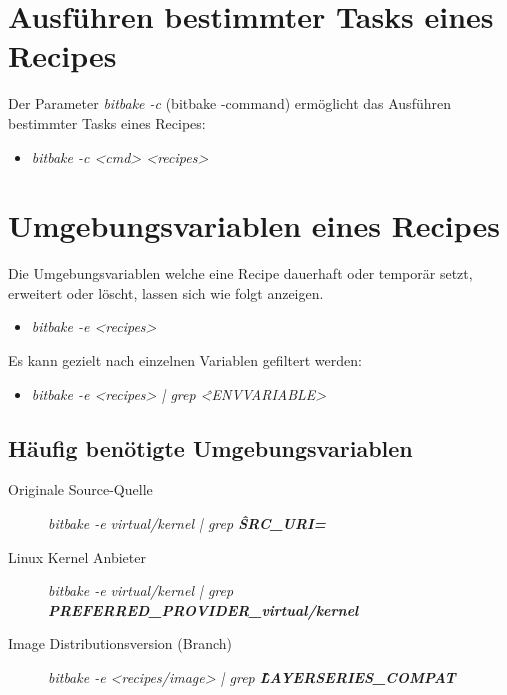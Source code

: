 \section{Ausführen bestimmter Tasks eines Recipes}%
\label{sec:ausfuhren_bestimmter_tasks_eines_recipies}

Der Parameter \textit{bitbake -c} (bitbake -command) ermöglicht das Ausführen
bestimmter Tasks eines Recipes:

\begin{itemize}
    \item \textit{bitbake -c <cmd> <recipes>}
\end{itemize}


\section{Umgebungsvariablen eines Recipes}%
\label{sec:umgebungsvariablen_eines_recipes}
Die Umgebungsvariablen welche eine Recipe dauerhaft oder temporär setzt,
erweitert oder löscht, lassen sich wie folgt anzeigen.
\begin{itemize}
    \item \textit{bitbake -e <recipes>}
\end{itemize}

Es kann gezielt nach einzelnen Variablen gefiltert werden:

\begin{itemize}
    \item \textit{bitbake -e <recipes> | grep \^<ENVVARIABLE>}
\end{itemize}

\subsection{Häufig benötigte Umgebungsvariablen}%
\label{sub:haufig_gesucht_umgebungsvariablen}

\begin{description}
   \item[Originale Source-Quelle] \textit{bitbake -e virtual/kernel | grep
       \textbf{\^SRC\_URI=}}
    \item[Linux Kernel Anbieter] \textit{bitbake -e virtual/kernel | \newline
            grep \textbf{ \glqq PREFERRED\_PROVIDER\_virtual/kernel\grqq}}
    \item[Image Distributionsversion (Branch)] \textit{bitbake -e
            <recipes/image> | \newline  grep \textbf{\^LAYERSERIES\_COMPAT}}
\end{description}

